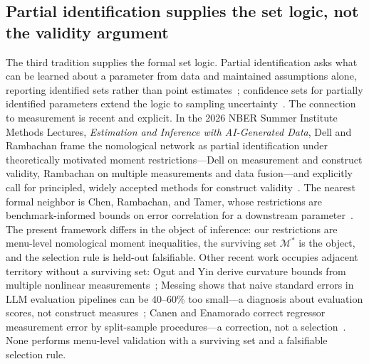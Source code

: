 \documentclass[10pt,letterpaper]{article}
\newcommand{\M}{\ensuremath{\mathcal{M}}}
\begin{document}
\subsection{Partial identification supplies the set logic, not the validity argument}
The third tradition supplies the formal set logic.
Partial identification asks what can be learned about a parameter from data and maintained assumptions alone, reporting identified sets rather than point estimates~\cite{manski2003,molinari2020}; confidence sets for partially identified parameters extend the logic to sampling uncertainty~\cite{imbensmanski2004,stoye2009}.
The connection to measurement is recent and explicit.
In the 2026 NBER Summer Institute Methods Lectures, \emph{Estimation and Inference with AI-Generated Data}, Dell and Rambachan frame the nomological network as partial identification under theoretically motivated moment restrictions---Dell on measurement and construct validity, Rambachan on multiple measurements and data fusion---and explicitly call for principled, widely accepted methods for construct validity~\cite{dellrambachan2026}.
The nearest formal neighbor is Chen, Rambachan, and Tamer, whose restrictions are benchmark-informed bounds on error correlation for a downstream parameter~\cite{chenrttamer2026}.
The present framework differs in the object of inference: our restrictions are menu-level nomological moment inequalities, the surviving set $\M^*$ is the object, and the selection rule is held-out falsifiable.
Other recent work occupies adjacent territory without a surviving set: Ogut and Yin derive curvature bounds from multiple nonlinear measurements~\cite{ogutyin2026}; Messing shows that naive standard errors in LLM evaluation pipelines can be 40--60\% too small---a diagnosis about evaluation scores, not construct measures~\cite{messing2026}; Canen and Enamorado correct regressor measurement error by split-sample procedures---a correction, not a selection~\cite{canenenamorado2026}.
None performs menu-level validation with a surviving set and a falsifiable selection rule.
\end{document}

